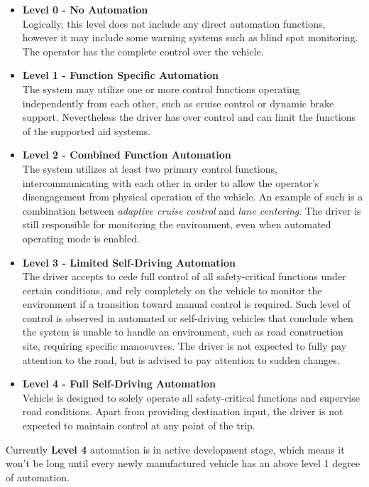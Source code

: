 \begin{itemize}

\item \textbf{Level 0 - No Automation} \\
Logically, this level does not include any direct automation functions, however it may include some warning systems such as blind spot monitoring. The operator has the complete control over the vehicle. 
\item \textbf{Level 1 - Function Specific Automation} \\
The system may utilize one or more control functions operating independently from each other, such as cruise control or dynamic brake support. Nevertheless the driver has over control and can limit the functions of the supported aid systems.
\item \textbf{Level 2 - Combined Function Automation} \\
The system utilizes at least two primary control functions, intercommunicating with each other in order to allow the operator's disengagement from physical operation of the vehicle. An example of such is a combination between \textit{adaptive cruise control} and \textit{lane centering}. The driver is still responsible for monitoring the environment, even when automated operating mode is enabled.
\item \textbf{Level 3 - Limited Self-Driving Automation} \\
The driver accepts to cede full control of all safety-critical functions under certain conditions, and rely completely on the vehicle to monitor the environment if a transition toward manual control is required. Such level of control is observed in automated or self-driving vehicles that conclude when the system is unable to handle an environment, such as road construction site, requiring specific manoeuvres. The driver is not expected to fully pay attention to the road, but is advised to pay attention to sudden changes.
\item \textbf{Level 4 - Full Self-Driving Automation} \\
Vehicle is designed to solely operate all safety-critical functions and supervise road conditions. Apart from providing destination input, the driver is not expected to maintain control at any point of the trip.
  
\end{itemize}

Currently \textbf{Level 4} automation is in active development stage, which means it won't be long until every newly manufactured vehicle has an above level 1 degree of automation.\cite{NHTSA}

